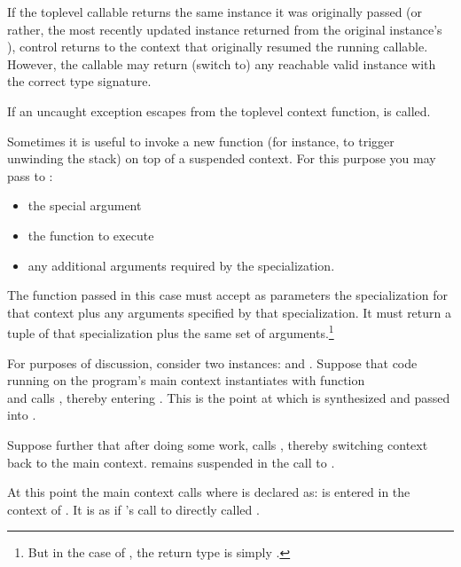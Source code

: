 If the toplevel callable returns the same \ectx instance it was originally
passed (or rather, the most recently updated instance returned from the
original instance's \op), control returns to the context that originally
resumed the running callable. However, the callable may return (switch to)
any reachable valid \ectx instance with the correct type signature.


If an uncaught exception escapes from the toplevel context function,
 is called.


Sometimes it is useful to invoke a new function (for instance, to trigger
unwinding the stack) on top of a suspended context. For this purpose you may
pass to \ectxop:

\begin{itemize}
  \item the special argument 
  \item the function to execute
  \item any additional arguments required by the \ectx specialization.
\end{itemize}

The function passed in this case must accept as parameters the \ectx
specialization for that context plus any arguments specified by that
specialization. It must return a tuple of that \ectx specialization plus the
same set of arguments.\footnote{But in the case
of , the return type is
simply .}

For purposes of discussion, consider two 
instances:  and . Suppose that code running
on the program's main context instantiates  with function\\
 and calls , thereby
entering . This is the point at which  is synthesized
and passed into .

Suppose further that after doing some work,  calls ,
thereby switching context back to the main context.  remains
suspended in the call to .

At this point the main context calls 
where  is declared as:
\newline
{}
\newline
{} is entered in the context of . It is as if 's call
to  directly called .

